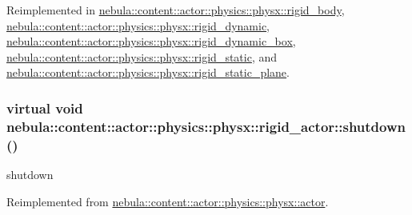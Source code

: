 Reimplemented in \hyperlink{classnebula_1_1content_1_1actor_1_1physics_1_1physx_1_1rigid__body_a10d2a077db15282d4a53ce95264704a3}{nebula::content::actor::physics::physx::rigid\_\-body}, \hyperlink{classnebula_1_1content_1_1actor_1_1physics_1_1physx_1_1rigid__dynamic_aeb4e0304888f8b4d3fdbebc61eb8a031}{nebula::content::actor::physics::physx::rigid\_\-dynamic}, \hyperlink{classnebula_1_1content_1_1actor_1_1physics_1_1physx_1_1rigid__dynamic__box_ad00353b6787484bdd2619f7294b82afb}{nebula::content::actor::physics::physx::rigid\_\-dynamic\_\-box}, \hyperlink{classnebula_1_1content_1_1actor_1_1physics_1_1physx_1_1rigid__static_adbbf849dd4601c92d5e292ae8158b769}{nebula::content::actor::physics::physx::rigid\_\-static}, and \hyperlink{classnebula_1_1content_1_1actor_1_1physics_1_1physx_1_1rigid__static__plane_a5a8ac2e89cea0594bb1d68fbc038c32a}{nebula::content::actor::physics::physx::rigid\_\-static\_\-plane}.\hypertarget{classnebula_1_1content_1_1actor_1_1physics_1_1physx_1_1rigid__actor_a0a7d4d923fa08fa0ae52b798978fab3f}{
\subsubsection[{shutdown}]{\setlength{\rightskip}{0pt plus 5cm}virtual void nebula::content::actor::physics::physx::rigid\_\-actor::shutdown ()}}
\label{classnebula_1_1content_1_1actor_1_1physics_1_1physx_1_1rigid__actor_a0a7d4d923fa08fa0ae52b798978fab3f}


shutdown 

Reimplemented from \hyperlink{classnebula_1_1content_1_1actor_1_1physics_1_1physx_1_1actor_ad7c3bd724933af584b3884c2613b39a8}{nebula::content::actor::physics::physx::actor}.

